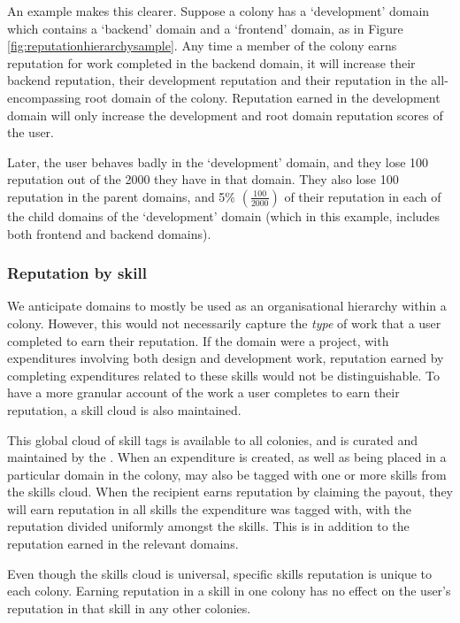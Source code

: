 An example makes this clearer. Suppose a colony has a `development' domain which contains a `backend' domain and a `frontend' domain, as in Figure \ref{fig:reputationhierarchysample}. Any time a member of the colony earns reputation for work completed in the backend domain, it will increase their backend reputation, their development reputation and their reputation in the all-encompassing root domain of the colony. Reputation earned in the development domain will only increase the development and root domain reputation scores of the user.

Later, the user behaves badly in the `development' domain, and they lose 100 reputation out of the 2000 they have in that domain. They also lose 100 reputation in the parent domains, and 5\% $\left(\frac{100}{2000}\right)$ of their reputation in each of the child domains of the `development' domain (which in this example, includes both frontend and backend domains).

\subsubsection*{Reputation by skill}\label{sec:rep-by-skill}

We anticipate domains to mostly be used as an organisational hierarchy within a colony. However, this would not necessarily capture the \emph{type} of work that a user completed to earn their reputation. If the domain were a project, with expenditures involving both design and development work, reputation earned by completing expenditures related to these skills would not be distinguishable. To have a more granular account of the work a user completes to earn their reputation, a skill cloud is also maintained.

This global cloud of skill tags is available to all colonies, and is curated and maintained by the \rc. When an expenditure is created, as well as being placed in a particular domain in the colony, may also be tagged with one or more skills from the skills cloud. When the recipient earns reputation by claiming the payout, they will earn reputation in all skills the expenditure was tagged with, with the reputation divided uniformly amongst the skills. This is in addition to the reputation earned in the relevant domains.

Even though the skills cloud is universal, specific skills reputation is unique to each colony. Earning reputation in a skill in one colony has no effect on the user's reputation in that skill in any other colonies.

